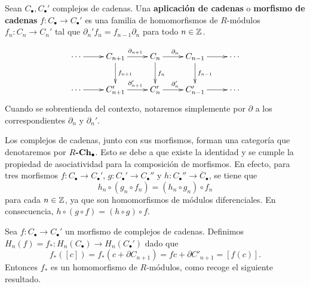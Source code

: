 \begin{definicion}
	Sean \(C_{\bullet},C_{\bullet}'\) complejos de cadenas. Una \textbf{aplicación
		de cadenas} o \textbf{morfismo de cadenas}
	\(f: C_{\bullet}\rightarrow C_{\bullet}'\) es una familia de homomorfismos de
	\(R\)-módulos \(f_{n}: C_{n}\rightarrow C_{n}'\) tal que
	\(\partial_{n}'f_{n}= f_{n-1}\partial_{n}\) para todo \(n \in \mathbb{Z}\).
\end{definicion}
\begin{equation}
	\label{chaincomplex}
	\xymatrix{
		\cdots \ar@{->}[r] & C_{n+1} \ar@{->}[r]^{\partial_{n+1}} \ar@{->}[d]^{f_{n+1}} & C_n \ar@{->}[r]^{\partial_{n}} \ar@{->}[d]^{f_n} & C_{n-1} \ar@{->}[r] \ar@{->}[d]^{f_{n-1}} & \cdots \\
		\cdots \ar@{->}[r] & C'_{n+1} \ar@{->}[r]^{\partial'_{n+1}} & C'_n \ar@{->}[r]^{\partial'_{n}} & C'_{n-1} \ar@{->}[r] & \cdots
	}
\end{equation}
Cuando se sobrentienda del contexto, notaremos simplemente por \(\partial\) a los correspondientes
\(\partial_{n}\) y \(\partial_{n}'\).

Los complejos de cadenas, junto con sus morfismos, forman una categoría que denotaremos
por \(R\textbf{-}\mathbf{Ch_\bullet}\). Esto se debe a que existe la identidad y se
cumple la propiedad de asociatividad para la composición de morfismos. En efecto,
para tres morfismos \(f : C_{\bullet} \to C_{\bullet}'\), \(g : C_{\bullet}' \to C_{\bullet}
''\) y \(h : C_{\bullet}'' \to \overline{C}_{\bullet}\), se tiene que
\[
h_{n} \circ (g_{n} \circ f_{n}) = (h_{n} \circ g_{n}) \circ f_{n}
\]
para cada \(n \in \mathbb{Z}\), ya que son homomorfismos de módulos diferenciales. En
consecuencia, \(h \circ (g \circ f) = (h \circ g) \circ f\).

Sea \(f : C_{\bullet} \to C_{\bullet}'\) un morfismo de complejos de cadenas.
Definimos \(H_{n}(f) = f_{*} : H_{n}(C_{\bullet}) \to H_{n}(C_{\bullet}')\) dado que 
\[
f_{*}([c]) = f_{*}(c + \partial C_{n+1}) = fc + \partial C'_{n+1} = [f(c)].
\]
Entonces \(f_{*}\) es un homomorfismo de \(R\)-módulos, como recoge el siguiente resultado.

